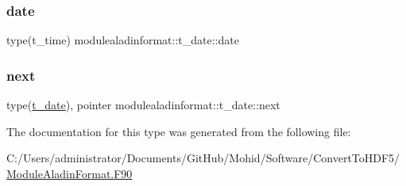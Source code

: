 \subsubsection{\texorpdfstring{date}{date}}
{\footnotesize\ttfamily type(t\+\_\+time) modulealadinformat\+::t\+\_\+date\+::date\hspace{0.3cm}{\ttfamily [private]}}

\mbox{\label{structmodulealadinformat_1_1t__date_abe677097b74750da796ea6d7188e9671}} 
\subsubsection{\texorpdfstring{next}{next}}
{\footnotesize\ttfamily type(\mbox{\hyperlink{structmodulealadinformat_1_1t__date}{t\+\_\+date}}), pointer modulealadinformat\+::t\+\_\+date\+::next\hspace{0.3cm}{\ttfamily [private]}}



The documentation for this type was generated from the following file\+:\begin{DoxyCompactItemize}
\item 
C\+:/\+Users/administrator/\+Documents/\+Git\+Hub/\+Mohid/\+Software/\+Convert\+To\+H\+D\+F5/\mbox{\hyperlink{_module_aladin_format_8_f90}{Module\+Aladin\+Format.\+F90}}\end{DoxyCompactItemize}
